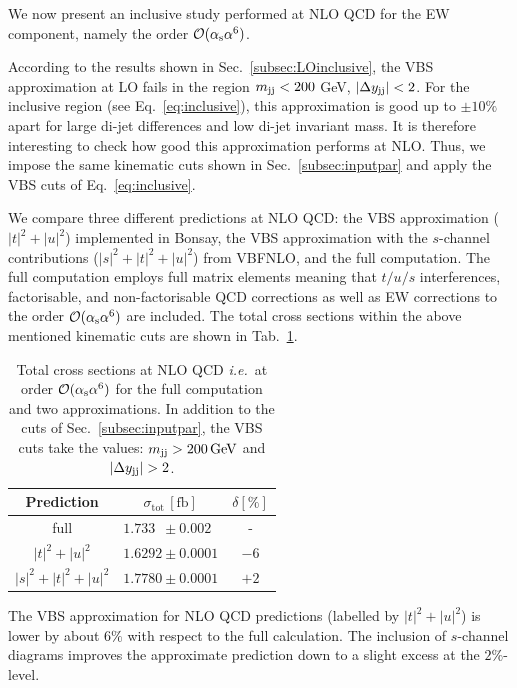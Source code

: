 We now present an inclusive study performed at NLO QCD for the EW component, namely the order $\mathcal{O}(\alpha_\text{s}\alpha^6)$.

According to the results shown in Sec.~\ref{subsec:LOinclusive}, the VBS approximation at LO fails in the region $m_{\text{j}\text{j}} < 200$ GeV, $|\Delta y_{\text{j}\text{j}}| < 2$.
For the inclusive region (see Eq.~\eqref{eq:inclusive}), this approximation is good up to $\pm10\%$ apart for large di-jet differences and low di-jet invariant mass.
It is therefore interesting to check how good this approximation performs at NLO.
Thus, we impose the same kinematic cuts shown in Sec.~\ref{subsec:inputpar} and apply the VBS cuts of Eq.~\eqref{eq:inclusive}.

We compare three different predictions at NLO QCD: 
the VBS approximation ($|t|^2+|u|^2$) implemented in {\sc Bonsay}, the VBS approximation with the $s$-channel contributions ($|s|^2+|t|^2+|u|^2$) from {\sc VBFNLO}, and the full computation.
The full computation employs full matrix elements meaning that $t/u/s$ interferences, factorisable, and non-factorisable QCD corrections as well as EW corrections to the order $\mathcal{O}(\alpha_\text{s} \alpha^6)$ are included.
The total cross sections within the above mentioned kinematic cuts are shown in Tab.~\ref{tab:crosssecINCLUSIVE}.

\begin{table}[h!]
\centering
\begin{tabular}{c|c|c}
Prediction & $\sigma_{\textrm{tot}}\,[\textrm{fb}]$ & $\delta [\%]$ \\
\hline
\hline
full &  $1.733\phantom{0} \pm 0.002\phantom{0}$ & - \\
\hline
$|t|^2 + |u|^2$ & $1.6292 \pm 0.0001$  &  $-6$ \\
\hline
$|s|^2 + |t|^2 + |u|^2$ & $1.7780 \pm 0.0001$  & $+2$
\end{tabular}
\caption{
Total cross sections at NLO QCD \emph{i.e.}\ at order $\mathcal{O}(\alpha_\text{s}\alpha^6)$ for the full computation and two approximations.
In addition to the cuts of Sec.~\ref{subsec:inputpar}, the VBS cuts take the values: $m_{\text{j}\text{j}}>200 \,\text{GeV}$ and $|\Delta y_{\Pj\Pj}|>2$.}
\label{tab:crosssecINCLUSIVE}
\end{table}

The VBS approximation for NLO QCD predictions (labelled by $|t|^2 + |u|^2$) is lower by about $6\%$ with respect to the full calculation.
The inclusion of $s$-channel diagrams improves the approximate prediction down to a slight excess at the $2\%$-level.

